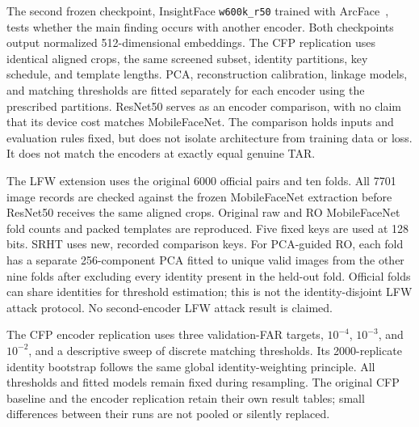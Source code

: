 



The second frozen checkpoint, InsightFace \texttt{w600k\_r50} trained with ArcFace~\cite{arcface}, tests whether the main finding occurs with another encoder. Both checkpoints output normalized 512-dimensional embeddings. The CFP replication uses identical aligned crops, the same screened subset, identity partitions, key schedule, and template lengths. PCA, reconstruction calibration, linkage models, and matching thresholds are fitted separately for each encoder using the prescribed partitions. ResNet50 serves as an encoder comparison, with no claim that its device cost matches MobileFaceNet. The comparison holds inputs and evaluation rules fixed, but does not isolate architecture from training data or loss. It does not match the encoders at exactly equal genuine TAR.

The LFW extension uses the original 6000 official pairs and ten folds. All 7701 image records are checked against the frozen MobileFaceNet extraction before ResNet50 receives the same aligned crops. Original raw and RO MobileFaceNet fold counts and packed templates are reproduced. Five fixed keys are used at 128 bits. SRHT uses new, recorded comparison keys. For PCA-guided RO, each fold has a separate 256-component PCA fitted to unique valid images from the other nine folds after excluding every identity present in the held-out fold. Official folds can share identities for threshold estimation; this is not the identity-disjoint LFW attack protocol. No second-encoder LFW attack result is claimed.


The CFP encoder replication uses three validation-FAR targets, $10^{-4}$, $10^{-3}$, and $10^{-2}$, and a descriptive sweep of discrete matching thresholds. Its 2000-replicate identity bootstrap follows the same global identity-weighting principle. All thresholds and fitted models remain fixed during resampling. The original CFP baseline and the encoder replication retain their own result tables; small differences between their runs are not pooled or silently replaced.
